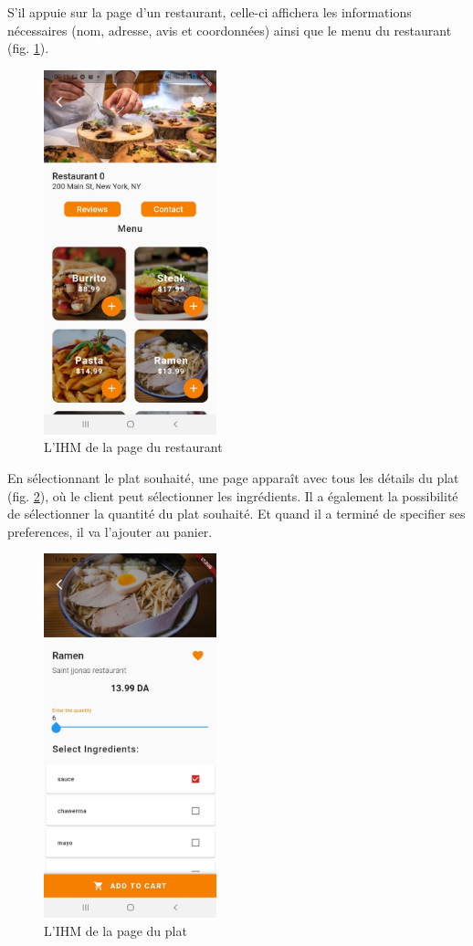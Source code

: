 \documentclass[french, a4paper, 12pt]{report}
\begin{document}
\newpage
S'il appuie sur la page d'un restaurant, celle-ci affichera les informations nécessaires (nom, adresse, avis et coordonnées) ainsi que le menu du restaurant (fig. \ref{fig:clires}).

			\begin{figure}[h!]
			\center
			\includegraphics[width=5cm]{screenshots/ClientViews/Restaurantmenu.jpg}
			\caption{L'IHM de la page du restaurant}
			\label{fig:clires}
		\end{figure}

\newpage
En sélectionnant le plat souhaité, une page apparaît avec tous les détails du plat (fig. \ref{fig:clidd}), où le client peut sélectionner les ingrédients. Il a également la possibilité de sélectionner la quantité du plat souhaité. Et quand il a terminé de specifier ses preferences, il va l'ajouter au panier.

			\begin{figure}[h!]
			\center
			\includegraphics[width=5cm]{screenshots/ClientViews/Dishdetails.jpg}
			\caption{L'IHM de la page du plat}
			\label{fig:clidd}
		\end{figure}
		
\end{document}
